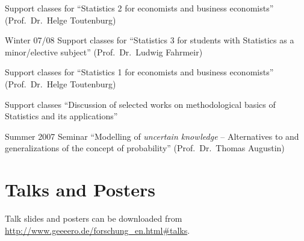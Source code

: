 \documentclass[a4paper]{simplecv}
\begin{document}
\begin{topic}
                    Support classes for ``Statistics 2 for economists and business economists'' (Prof.\ Dr.\ Helge Toutenburg)

\item[Winter 07/08] Support classes for ``Statistics 3 for students with Statistics as a minor/elective subject'' (Prof.\ Dr.\ Ludwig Fahrmeir)

                    Support classes for ``Statistics 1 for economists and business economists'' (Prof.\ Dr.\ Helge Toutenburg)

                    Support classes ``Discussion of selected works on methodological basics of Statistics and its applications''

\item[Summer 2007]  Seminar ``Modelling of \emph{uncertain knowledge} -- Alternatives to and generalizations of the concept of probability'' (Prof.\ Dr.\ Thomas Augustin)
\end{topic}


\section{Talks and Posters}
\label{talks}

Talk slides and posters can be downloaded from \url{http://www.geeeero.de/forschung_en.html#talks}.
\end{document}

